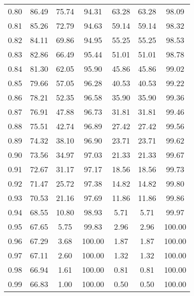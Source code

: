 \begin{tabular}{|c|c|c|c|c|c|c|}
      0.80 &     86.49 &     75.74 &      94.31 &   63.28 &      63.28 &         98.09 \\
      0.81 &     85.26 &     72.79 &      94.63 &   59.14 &      59.14 &         98.32 \\
      0.82 &     84.11 &     69.86 &      94.95 &   55.25 &      55.25 &         98.53 \\
      0.83 &     82.86 &     66.49 &      95.44 &   51.01 &      51.01 &         98.78 \\
      0.84 &     81.30 &     62.05 &      95.90 &   45.86 &      45.86 &         99.02 \\
      0.85 &     79.66 &     57.05 &      96.28 &   40.53 &      40.53 &         99.22 \\
      0.86 &     78.21 &     52.35 &      96.58 &   35.90 &      35.90 &         99.36 \\
      0.87 &     76.91 &     47.88 &      96.73 &   31.81 &      31.81 &         99.46 \\
      0.88 &     75.51 &     42.74 &      96.89 &   27.42 &      27.42 &         99.56 \\
      0.89 &     74.32 &     38.10 &      96.90 &   23.71 &      23.71 &         99.62 \\
      0.90 &     73.56 &     34.97 &      97.03 &   21.33 &      21.33 &         99.67 \\
      0.91 &     72.67 &     31.17 &      97.17 &   18.56 &      18.56 &         99.73 \\
      0.92 &     71.47 &     25.72 &      97.38 &   14.82 &      14.82 &         99.80 \\
      0.93 &     70.53 &     21.16 &      97.69 &   11.86 &      11.86 &         99.86 \\
      0.94 &     68.55 &     10.80 &      98.93 &    5.71 &       5.71 &         99.97 \\
      0.95 &     67.65 &      5.75 &      99.83 &    2.96 &       2.96 &        100.00 \\
      0.96 &     67.29 &      3.68 &     100.00 &    1.87 &       1.87 &        100.00 \\
      0.97 &     67.11 &      2.60 &     100.00 &    1.32 &       1.32 &        100.00 \\
      0.98 &     66.94 &      1.61 &     100.00 &    0.81 &       0.81 &        100.00 \\
      0.99 &     66.83 &      1.00 &     100.00 &    0.50 &       0.50 &        100.00 \\
\bottomrule
\end{tabular}

